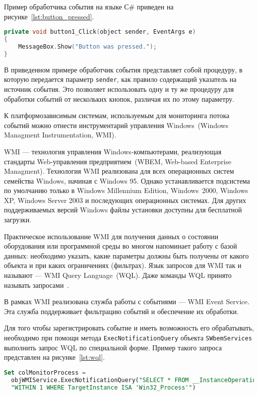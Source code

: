 Пример обработчика события на языке С\# приведен на рисунке~\ref{lst:button_pressed}.
\begin{lstlisting}[basicstyle=\scriptsize\ttfamily,
                   numberstyle=\scriptsize\ttfamily,
                   xleftmargin=7mm,
                   language=C++,caption=Пример обработчика событий на языке C\#,
                   label=lst:button_pressed]
private void button1_Click(object sender, EventArgs e)
{
    MessageBox.Show("Button was pressed.");
}
\end{lstlisting}

В приведенном примере обработчик события представляет собой процедуру, в которую
передается параметр \texttt{sender}, как правило содержащий указатель на
источник события. Это позволяет использовать одну и ту же процедуру
для обработки событий от нескольких кнопок, различая их по этому параметру.

К платформозависимым системам, используемым для мониторинга потока событий
можно отнести инструментарий управления Windows~(Windows Managment
Instrumentation, WMI).

WMI --- технология управления Windows-компьютерами, реализующая
стандарты Web-управления предприятием~(WBEM, Web-based Enterprise Managment).
Технология WMI реализована для всех операционных систем семейства Windows,
начиная с Windows 95. Однако устанавливается подсистема по умолчанию только
в Windows Millennium Edition, Windows~2000, Windows XP, Windows Server 2003 и
последующих операционных системах. Для других поддерживаемых версий Windows
файлы установки доступны для бесплатной загрузки.

Практическое использование WMI для получения данных о состоянии оборудования
или программной среды во многом напоминает работу с базой данных: необходимо
указать, какие параметры должны быть получены от какого объекта и при каких
ограничениях (фильтрах). Язык запросов для WMI так и называют --- WMI Query
Language~(WQL). Даже команды WQL принято называть запросами~\cite{sysadmin_practice}.

В рамках WMI реализована служба работы с событиями --- WMI Event Service. Эта
служба поддерживает фильтрацию событий и обеспечение их обработки.

Для того чтобы зарегистрировать событие и иметь возможность его обрабатывать,
необходимо при помощи метода \texttt{ExecNotificationQuery} объекта
\texttt{SWbemServices} выполнить запрос WQL по специальной форме.
Пример такого запроса представлен на рисунке~\ref{lst:wql}.
\begin{lstlisting}[basicstyle=\scriptsize\ttfamily,
                   numberstyle=\scriptsize\ttfamily,
                   xleftmargin=7mm,
                   language=sql,caption=Пример WQL запроса,
                   label=lst:wql]
Set colMonitorProcess =
  objWMIService.ExecNotificationQuery("SELECT * FROM __InstanceOperationEvent " &
  "WITHIN 1 WHERE TargetInstance ISA 'Win32_Process'")
\end{lstlisting}

